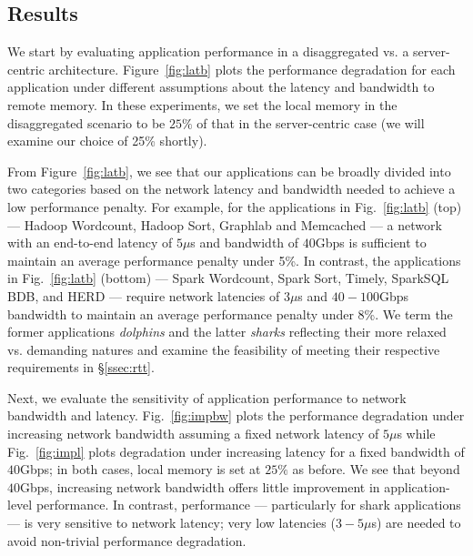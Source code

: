 \subsection{Results}
\label{ssec:rr}
We start by evaluating application performance in a disaggregated vs. a server-centric architecture. 
Figure~\ref{fig:latb} plots the performance degradation for each application under different assumptions about the latency and bandwidth to remote memory. In these experiments, we set the local memory in the disaggregated scenario to be  $25\%$ of that in the server-centric case (we will examine our choice of 25\% shortly). 

From Figure~\ref{fig:latb}, we see that our applications can be broadly divided into two categories based on the network latency and bandwidth needed to achieve a low performance penalty.
For example, for the applications in Fig.~\ref{fig:latb} (top) --- Hadoop Wordcount, Hadoop Sort, Graphlab and Memcached --- a network with an end-to-end latency of $5\mu$s and bandwidth of $40$Gbps is sufficient to maintain an average performance penalty under 5\%. 
In contrast, the applications in Fig.~\ref{fig:latb} (bottom) --- Spark Wordcount, Spark Sort, Timely, SparkSQL BDB, and HERD --- require network latencies of $3\mu$s and $40-100$Gbps bandwidth to maintain an average performance penalty under 8\%. We term the former applications {\em dolphins} and the latter {\em sharks} reflecting their more relaxed vs. demanding natures and examine the feasibility of meeting their respective requirements in \S\ref{ssec:rtt}.

Next, we evaluate the sensitivity of application performance to network bandwidth and latency. Fig.~\ref{fig:impbw} plots the performance degradation under increasing network bandwidth assuming a fixed network latency of $5\mu$s while Fig.~\ref{fig:impl} plots degradation under increasing latency for a fixed bandwidth of $40$Gbps; in both cases, local memory is set at $25\%$ as before.
We see that beyond $40$Gbps, increasing network bandwidth offers little improvement in application-level performance. 
%
%
In contrast, performance --- particularly for shark applications --- is very sensitive to network latency; very low latencies ($3-5\mu$s) are needed to avoid non-trivial performance degradation.


